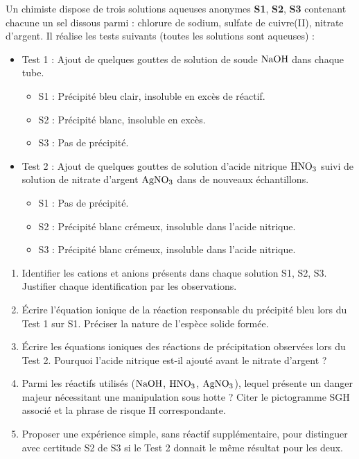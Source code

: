 \documentclass[11pt]{article}
\begin{document}
\begin{exercice}
Un chimiste dispose de trois solutions aqueuses anonymes \textbf{S1}, \textbf{S2}, \textbf{S3} contenant chacune un sel dissous parmi : chlorure de sodium, sulfate de cuivre(II), nitrate d'argent. Il réalise les tests suivants (toutes les solutions sont aqueuses) :
\begin{itemize}
    \item Test 1 : Ajout de quelques gouttes de solution de soude $\ce{NaOH}$ dans chaque tube.
        \begin{itemize}
            \item S1 : Précipité bleu clair, insoluble en excès de réactif.
            \item S2 : Précipité blanc, insoluble en excès.
            \item S3 : Pas de précipité.
        \end{itemize}
    \item Test 2 : Ajout de quelques gouttes de solution d'acide nitrique $\ce{HNO3}$ suivi de solution de nitrate d'argent $\ce{AgNO3}$ dans de nouveaux échantillons.
        \begin{itemize}
            \item S1 : Pas de précipité.
            \item S2 : Précipité blanc crémeux, insoluble dans l'acide nitrique.
            \item S3 : Précipité blanc crémeux, insoluble dans l'acide nitrique.
        \end{itemize}
\end{itemize}
\begin{enumerate}
    \item Identifier les cations et anions présents dans chaque solution S1, S2, S3. Justifier chaque identification par les observations.
    \item Écrire l'équation ionique de la réaction responsable du précipité bleu lors du Test 1 sur S1. Préciser la nature de l'espèce solide formée.
    \item Écrire les équations ioniques des réactions de précipitation observées lors du Test 2. Pourquoi l'acide nitrique est-il ajouté avant le nitrate d'argent ?
    \item Parmi les réactifs utilisés ($\ce{NaOH}$, $\ce{HNO3}$, $\ce{AgNO3}$), lequel présente un danger majeur nécessitant une manipulation sous hotte ? Citer le pictogramme SGH associé et la phrase de risque H correspondante.
    \item Proposer une expérience simple, sans réactif supplémentaire, pour distinguer avec certitude S2 de S3 si le Test 2 donnait le même résultat pour les deux.
\end{enumerate}
\end{exercice}
\end{document}

